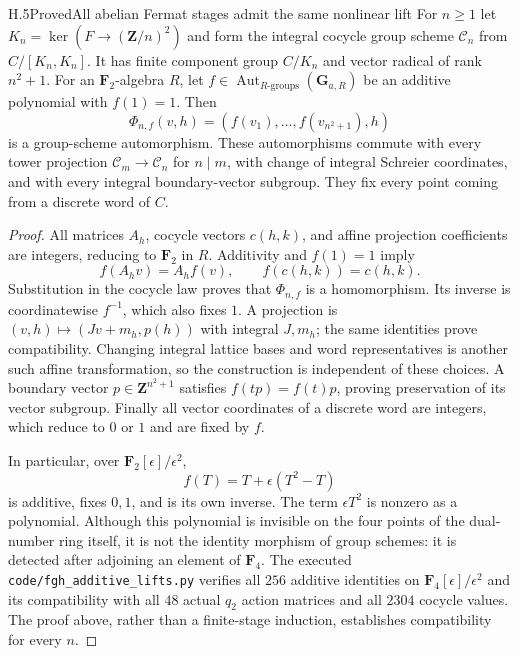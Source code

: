 \begin{statement}{H.5}{Proved}{All abelian Fermat stages admit the same nonlinear lift}
For $n\geq1$ let $K_n=\ker(F\to(\mathbf Z/n)^2)$ and form the
integral cocycle group scheme $\mathscr C_n$ from
$C/[K_n,K_n]$. It has finite component group $C/K_n$ and vector
radical of rank $n^2+1$. For an $\mathbf F_2$-algebra $R$, let
$f\in\operatorname{Aut}_{R\text{-groups}}(\mathbf G_{a,R})$
be an additive polynomial with $f(1)=1$. Then
\[
       \Phi_{n,f}(v,h)=(f(v_1),\ldots,f(v_{n^2+1}),h)
\]
is a group-scheme automorphism. These automorphisms commute with
every tower projection $\mathscr C_m\to\mathscr C_n$ for $n\mid m$,
with change of integral Schreier coordinates, and with every
integral boundary-vector subgroup. They fix every point coming
from a discrete word of $C$.
\end{statement}
\begin{proof}
All matrices $A_h$, cocycle vectors $c(h,k)$, and affine projection
coefficients are integers, reducing to $\mathbf F_2$ in $R$.
Additivity and $f(1)=1$ imply
\[
 f(A_hv)=A_hf(v),\qquad f(c(h,k))=c(h,k).
\]
Substitution in the cocycle law proves that $\Phi_{n,f}$ is a
homomorphism. Its inverse is coordinatewise $f^{-1}$, which also
fixes $1$. A projection is $(v,h)\mapsto(Jv+m_h,p(h))$ with
integral $J,m_h$; the same identities prove compatibility.
Changing integral lattice bases and word representatives is another
such affine transformation, so the construction is independent of
these choices. A boundary vector $p\in\mathbf Z^{n^2+1}$ satisfies
$f(tp)=f(t)p$, proving preservation of its vector subgroup. Finally
all vector coordinates of a discrete word are integers, which
reduce to $0$ or $1$ and are fixed by $f$.

In particular, over $\mathbf F_2[\epsilon]/\epsilon^2$,
\[
             f(T)=T+\epsilon(T^2-T)
\]
is additive, fixes $0,1$, and is its own inverse. The term
$\epsilon T^2$ is nonzero as a polynomial. Although this polynomial
is invisible on the four points of the dual-number ring itself,
it is not the identity morphism of group schemes: it is detected
after adjoining an element of $\mathbf F_4$. The executed
\texttt{code/fgh\_additive\_lifts.py} verifies all $256$ additive
identities on $\mathbf F_4[\epsilon]/\epsilon^2$ and its
compatibility with all $48$ actual $q_2$ action matrices and all
$2304$ cocycle values. The proof above, rather than a finite-stage
induction, establishes compatibility for every $n$.
\end{proof}

